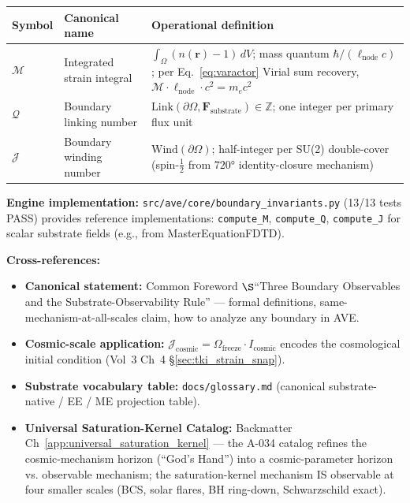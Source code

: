 \begin{center}\small
\begin{tabular}{|p{1.3cm}|p{4.5cm}|p{6cm}|}
\hline
\textbf{Symbol} & \textbf{Canonical name} & \textbf{Operational definition} \\
\hline
$\mathcal{M}$ & Integrated strain integral & $\int_\Omega (n(\mathbf{r}) - 1)\, dV$; mass quantum $\hbar/(\ell_{\text{node}} c)$; per Eq.~\ref{eq:varactor} Virial sum recovery, $\mathcal{M} \cdot \ell_{\text{node}} \cdot c^2 = m_e c^2$ \\
\hline
$\mathcal{Q}$ & Boundary linking number & $\mathrm{Link}(\partial\Omega, \mathbf{F}_{\text{substrate}}) \in \mathbb{Z}$; one integer per primary flux unit \\
\hline
$\mathcal{J}$ & Boundary winding number & $\mathrm{Wind}(\partial\Omega)$; half-integer per SU(2) double-cover (spin-$\tfrac{1}{2}$ from $720°$ identity-closure mechanism) \\
\hline
\end{tabular}
\end{center}

\textbf{Engine implementation:} \texttt{src/ave/core/boundary\_invariants.py}
(13/13 tests PASS) provides reference implementations: \texttt{compute\_M},
\texttt{compute\_Q}, \texttt{compute\_J} for scalar substrate fields
(e.g., from MasterEquationFDTD).

\textbf{Cross-references:}
\begin{itemize}\itemsep 0pt
\item \textbf{Canonical statement:} Common Foreword $\S$``Three Boundary
  Observables and the Substrate-Observability Rule'' --- formal definitions,
  same-mechanism-at-all-scales claim, how to analyze any boundary in AVE.
\item \textbf{Cosmic-scale application:}
  $\mathcal{J}_{\text{cosmic}} = \Omega_{\text{freeze}} \cdot I_{\text{cosmic}}$
  encodes the cosmological initial condition (Vol~3 Ch~4 \S\ref{sec:tki_strain_snap}).
\item \textbf{Substrate vocabulary table:} \texttt{docs/glossary.md} (canonical
  substrate-native / EE / ME projection table).
\item \textbf{Universal Saturation-Kernel Catalog:} Backmatter
  Ch~\ref{app:universal_saturation_kernel} --- the A-034 catalog refines the
  cosmic-mechanism horizon (``God's Hand'') into a cosmic-parameter horizon vs.
  observable mechanism; the saturation-kernel mechanism IS observable at four
  smaller scales (BCS, solar flares, BH ring-down, Schwarzschild exact). %
\end{itemize}

